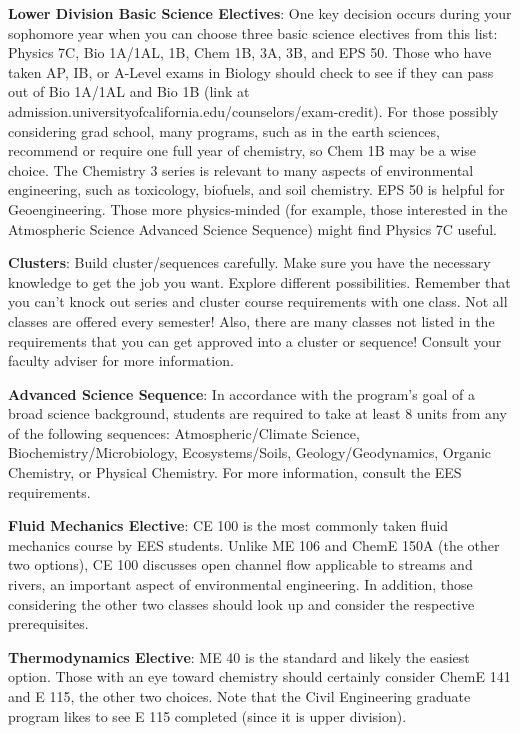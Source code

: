 \textbf{Lower Division Basic Science Electives}: One key decision occurs during your sophomore year when you can choose three basic science electives from this list: Physics 7C, Bio 1A/1AL, 1B, Chem 1B, 3A, 3B, and EPS 50. Those who have taken AP, IB, or A-Level exams in Biology should check to see if they can pass out of Bio 1A/1AL and Bio 1B (link at {\selectfont admission.universityofcalifornia.edu/counselors/exam-credit}). For those possibly considering grad school, many programs, such as in the earth sciences, recommend or require one full year of chemistry, so Chem 1B may be a wise choice. The Chemistry 3 series is relevant to many aspects of environmental engineering, such as toxicology, biofuels, and soil chemistry. EPS 50 is helpful for Geoengineering. Those more physics-minded (for example, those interested in the Atmospheric Science Advanced Science Sequence) might find Physics 7C useful.

\textbf{Clusters}: Build cluster/sequences carefully. Make sure you have the necessary knowledge to get the job you want. Explore different possibilities. Remember that you can’t knock out series and cluster course requirements with one class. Not all classes are offered every semester! Also, there are many classes not listed in the requirements that you can get approved into a cluster or sequence! Consult your faculty adviser for more information.

\textbf{Advanced Science Sequence}: In accordance with the program’s goal of a broad science background, students are required to take at least 8 units from any of the following sequences: Atmospheric/Climate Science, Biochemistry/Microbiology, Ecosystems/Soils, Geology/Geodynamics, Organic Chemistry, or Physical Chemistry. For more information, consult the EES requirements.

\textbf{Fluid Mechanics Elective}: CE 100 is the most commonly taken fluid mechanics course by EES students. Unlike ME 106 and ChemE 150A (the other two options), CE 100 discusses open channel flow applicable to streams and rivers, an important aspect of environmental engineering. In addition, those considering the other two classes should look up and consider the respective prerequisites.

\textbf{Thermodynamics Elective}: ME 40 is the standard and likely the easiest option. Those with an eye toward chemistry should certainly consider ChemE 141 and E 115, the other two choices. Note that the Civil Engineering graduate program likes to see E 115 completed (since it is upper division).

